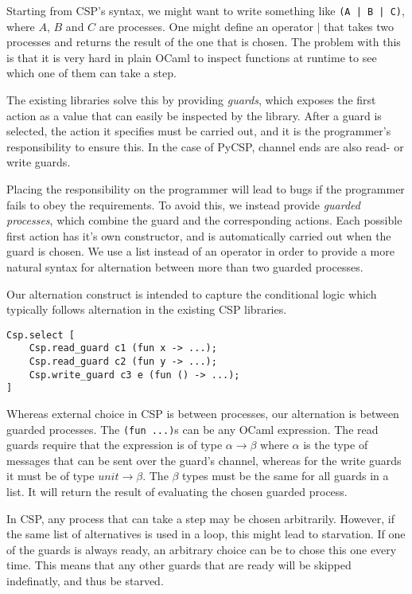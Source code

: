 \documentclass[a4paper,12pt]{article}
\begin{document}
Starting from CSP's syntax, we might want to write something like \texttt{(A | B | C)}, where $A$, $B$
and $C$ are processes. One might define an operator $|$ that takes two processes and returns the result 
of the one that is chosen. The problem with this is that it is very hard in plain OCaml to inspect 
functions at runtime to see which one of them can take a step.

The existing libraries solve this by providing \emph{guards}, which exposes the first action as a value 
that can easily be inspected by the library. After a guard is selected, the action it specifies must be 
carried out, and it is the programmer's responsibility to ensure this. In the case of PyCSP, channel
ends are also read- or write guards. 

Placing the responsibility on the programmer will lead to bugs if the programmer fails to obey the 
requirements. To avoid this, we instead provide \emph{guarded processes}, which combine the guard and
the corresponding actions. Each possible first action has it's own constructor, and is automatically 
carried out when the guard is chosen. We use a list instead of an operator in order to provide a more 
natural syntax for alternation between more than two guarded processes.

Our alternation construct is intended to capture the conditional logic which typically follows 
alternation in the existing CSP libraries.

\begin{verbatim}
Csp.select [
    Csp.read_guard c1 (fun x -> ...);
    Csp.read_guard c2 (fun y -> ...);
    Csp.write_guard c3 e (fun () -> ...);
]
\end{verbatim}

Whereas external choice in CSP is between processes, our alternation is between guarded processes.
The \verb|(fun ...)|s can be any OCaml expression. The read guards require that the expression is of type
$\alpha \to \beta$ where $\alpha$ is the type of messages that can be sent over the guard's channel, whereas
for the write guards it must be of type $unit \to \beta$. The $\beta$ types must be the same for all guards in 
a list. It will return the result of evaluating the chosen guarded process.

In CSP, any process that can take a step may be chosen arbitrarily. However, if the same list of 
alternatives is used in a loop, this might lead to starvation. If one of the guards is always ready,
an arbitrary choice can be to chose this one every time. This means that any other guards that are 
ready will be skipped indefinatly, and thus be starved.
\end{document}
